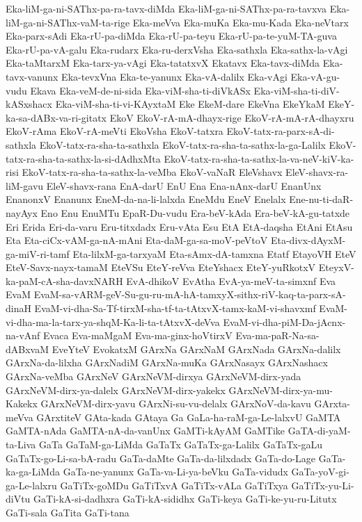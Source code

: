 {Eka-liM-ga-ni-SAThx-pa-ra-tavx-diMda
Eka-liM-ga-ni-SAThx-pa-ra-tavxva
Eka-liM-ga-ni-SAThx-vaM-ta-rige
Eka-meVva
Eka-muKa
Eka-mu-Kada
Eka-neVtarx
Eka-parx-sAdi
Eka-rU-pa-diMda
Eka-rU-pa-teyu
Eka-rU-pa-te-yuM-TA-guva
Eka-rU-pa-vA-galu
Eka-rudarx
Eka-ru-derxVsha
Eka-sathxla
Eka-sathx-la-vAgi
Eka-taMtarxM
Eka-tarx-ya-vAgi
Eka-tatatxvX
Ekatavx
Eka-tavx-diMda
Eka-tavx-vanunx
Eka-tevxVna
Eka-te-yanunx
Eka-vA-dalilx
Eka-vAgi
Eka-vA-gu-vudu
Ekava
Eka-veM-de-ni-sida
Eka-viM-sha-ti-diVkASx
Eka-viM-sha-ti-diV-kASxshacx
Eka-viM-sha-ti-vi-KAyxtaM
Eke
EkeM-dare
EkeVna
EkeYkaM
EkeY-ka-sa-dABx-va-ri-gitatx
EkoV
EkoV-rA-mA-dhayx-rige
EkoV-rA-mA-rA-dhayxru
EkoV-rAma
EkoV-rA-meVti
EkoVsha
EkoV-tatxra
EkoV-tatx-ra-parx-sA-di-sathxla
EkoV-tatx-ra-sha-ta-sathxla
EkoV-tatx-ra-sha-ta-sathx-la-ga-Lalilx
EkoV-tatx-ra-sha-ta-sathx-la-si-dAdhxMta
EkoV-tatx-ra-sha-ta-sathx-la-va-neV-kiV-ka-risi
EkoV-tatx-ra-sha-ta-sathx-la-veMba
EkoV-vaNaR
EleVshavx
EleV-shavx-ra-liM-gavu
EleV-shavx-rana
EnA-darU
EnU
Ena
Ena-nAnx-darU
EnanUnx
EnanonxV
Enanunx
EneM-da-na-li-lalxda
EneMdu
EneV
Enelalx
Ene-nu-ti-daR-nayAyx
Eno
Enu
EnuMTu
EpaR-Du-vudu
Era-beV-kAda
Era-beV-kA-gu-tatxde
Eri
Erida
Eri-da-varu
Eru-titxdadx
Eru-vAta
Esu
EtA
EtA-daqsha
EtAni
EtAsu
Eta
Eta-ciCx-vAM-ga-nA-mAni
Eta-daM-ga-sa-moV-peVtoV
Eta-divx-dAyxM-ga-miV-ri-tamf
Eta-lilxM-ga-tarxyaM
Eta-sAmx-dA-tamxna
Etatf
EtayoVH
EteV
EteV-Savx-nayx-tamaM
EteVSu
EteY-reVva
EteYshacx
EteY-yuRkotxV
EteyxV-ka-paM-cA-sha-davxNARH
EvA-dhikoV
EvAtha
EvA-ya-meV-ta-simxnf
Eva
EvaM
EvaM-sa-vARM-geV-Su-gu-ru-mA-hA-tamxyX-sithx-riV-kaq-ta-parx-sA-dinaH
EvaM-vi-dha-Sa-Tf-tirxM-sha-tf-ta-tAtxvX-tamx-kaM-vi-shavxmf
EvaM-vi-dha-ma-la-tarx-ya-shqM-Ka-li-ta-tAtxvX-deVva
EvaM-vi-dha-piM-Da-jAcnx-na-vAnf
Evaca
Eva-maMgaM
Eva-ma-ginx-hoVtirxV
Eva-ma-paR-Na-sa-dABxvaM
EveYteV
EvokatxM
GArxNa
GArxNaM
GArxNada
GArxNa-dalilx
GArxNa-da-lilxha
GArxNadiM
GArxNa-muKa
GArxNasayx
GArxNashacx
GArxNa-veMba
GArxNeV
GArxNeVM-dirxya
GArxNeVM-dirx-yada
GArxNeVM-dirx-ya-dalelx
GArxNeVM-dirx-yakekx
GArxNeVM-dirx-ya-mu-Kakekx
GArxNeVM-dirx-yavu
GArxNi-su-vu-delalx
GArxNoV-da-kavu
GArxta-meVva
GArxtiteV
GAta-kada
GAtaya
Ga
GaLa-ha-raM-ga-Le-lalxvU
GaMTA
GaMTA-nAda
GaMTA-nA-da-vanUnx
GaMTi-kAyAM
GaMTike
GaTA-di-yaM-ta-Liva
GaTa
GaTaM-ga-LiMda
GaTaTx
GaTaTx-ga-Lalilx
GaTaTx-gaLu
GaTaTx-go-Li-sa-bA-radu
GaTa-daMte
GaTa-da-lilxdadx
GaTa-do-Lage
GaTa-ka-ga-LiMda
GaTa-ne-yanunx
GaTa-va-Li-ya-beVku
GaTa-vidudx
GaTa-yoV-gi-ga-Le-lalxru
GaTiTx-goMDu
GaTiTxvA
GaTiTx-vALa
GaTiTxya
GaTiTx-yu-Li-diVtu
GaTi-kA-si-dadhxra
GaTi-kA-sididhx
GaTi-keya
GaTi-ke-yu-ru-Litutx
GaTi-sala
GaTita
GaTi-tana
}
